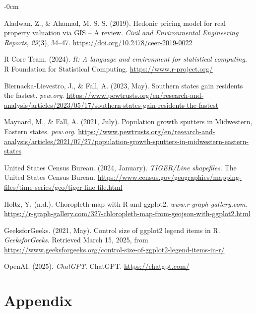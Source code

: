 \documentclass[journal,article,submit,pdftex,moreauthors]{Definitions/mdpi}
\begin{document}
\begin{adjustwidth}{-\extralength}{0cm}
\begin{thebibliography}{99}
Aladwan, Z., \& Ahamad, M. S. S. (2019). Hedonic pricing model for real property valuation via GIS – A review. \textit{Civil and Environmental Engineering Reports}, \textit{29}(3), 34–47. \url{https://doi.org/10.2478/ceer-2019-0022}

R Core Team. (2024). \textit{R: A language and environment for statistical computing}. R Foundation for Statistical Computing. \url{https://www.r-project.org/}

Biernacka-Lievestro, J., \& Fall, A. (2023, May). Southern states gain residents the fastest. \textit{pew.org}. \url{https://www.pewtrusts.org/en/research-and-analysis/articles/2023/05/17/southern-states-gain-residents-the-fastest}

Maynard, M., \& Fall, A. (2021, July). Population growth sputters in Midwestern, Eastern states. \textit{pew.org}. \url{https://www.pewtrusts.org/en/research-and-analysis/articles/2021/07/27/population-growth-sputters-in-midwestern-eastern-states}

United States Census Bureau. (2024, January). \textit{TIGER/Line shapefiles}. The United States Census Bureau. \url{https://www.census.gov/geographies/mapping-files/time-series/geo/tiger-line-file.html}

Holtz, Y. (n.d.). Choropleth map with R and ggplot2. \textit{www.r-graph-gallery.com}. \url{https://r-graph-gallery.com/327-chloropleth-map-from-geojson-with-ggplot2.html}

GeeksforGeeks. (2021, May). Control size of ggplot2 legend items in R. \textit{GeeksforGeeks}. Retrieved March 15, 2025, from \url{https://www.geeksforgeeks.org/control-size-of-ggplot2-legend-items-in-r/}

OpenAI. (2025). \textit{ChatGPT}. ChatGPT. \url{https://chatgpt.com/}


\end{thebibliography}



\clearpage
{}
{}
\section{Appendix}


\end{adjustwidth}
\end{document}
